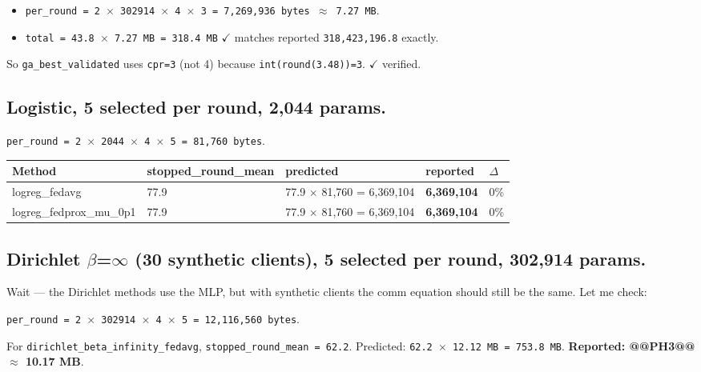 \documentclass{article}
\begin{document}
\begin{itemize}[leftmargin=1.4em,itemsep=2pt,topsep=2pt]
  \item \texttt{per\_round = 2 \ensuremath{\times} 302914 \ensuremath{\times} 4 \ensuremath{\times} 3 = 7,269,936 bytes \ensuremath{\approx} 7.27 MB}.
  \item \texttt{total = 43.8 \ensuremath{\times} 7.27 MB = 318.4 MB} \ensuremath{\checkmark} matches reported \texttt{318,423,196.8} exactly.
\end{itemize}


So \texttt{ga\_best\_validated} uses \texttt{cpr=3} (not 4) because \texttt{int(round(3.48))=3}. \ensuremath{\checkmark} verified.


\subsection{Logistic, 5 selected per round, 2,044 params.}


\texttt{per\_round = 2 \ensuremath{\times} 2044 \ensuremath{\times} 4 \ensuremath{\times} 5 = 81,760 bytes}.


\begin{table}[H]
  \centering
  \begin{tabular}{lllll}
    \toprule
    Method & stopped\_round\_mean & predicted & reported & \ensuremath{\Delta} \\
    \midrule
    logreg\_fedavg & 77.9 & 77.9 \ensuremath{\times} 81,760 = 6,369,104 & \textbf{6,369,104} & 0\% \\
    logreg\_fedprox\_mu\_0p1 & 77.9 & 77.9 \ensuremath{\times} 81,760 = 6,369,104 & \textbf{6,369,104} & 0\% \\
    \bottomrule
  \end{tabular}
\end{table}


\subsection{Dirichlet \ensuremath{\beta}=\ensuremath{\infty} (30 synthetic clients), 5 selected per round, 302,914 params.}


Wait --- the Dirichlet methods use the MLP, but with synthetic clients the comm equation should still be the same. Let me check:


\texttt{per\_round = 2 \ensuremath{\times} 302914 \ensuremath{\times} 4 \ensuremath{\times} 5 = 12,116,560 bytes}.


For \texttt{dirichlet\_beta\_infinity\_fedavg}, \texttt{stopped\_round\_mean = 62.2}. Predicted: \texttt{62.2 \ensuremath{\times} 12.12 MB = 753.8 MB}. \textbf{Reported: @@PH3@@ \ensuremath{\approx} 10.17 MB}.
\end{document}
